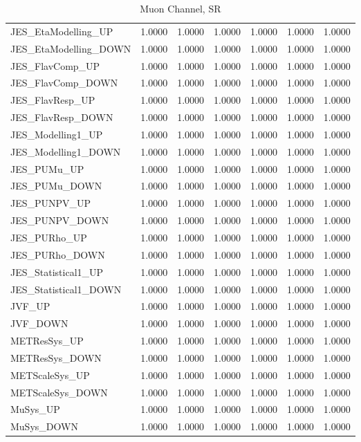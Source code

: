 \documentclass[11pt,oneside,a4paper]{article}
\begin{document}
\begin{table}
\begin{tabular}{lrrrrrr}
JES\_EtaModelling\_UP & 1.0000 & 1.0000 & 1.0000 & 1.0000 & 1.0000 & 1.0000 \\
JES\_EtaModelling\_DOWN & 1.0000 & 1.0000 & 1.0000 & 1.0000 & 1.0000 & 1.0000 \\
JES\_FlavComp\_UP & 1.0000 & 1.0000 & 1.0000 & 1.0000 & 1.0000 & 1.0000 \\
JES\_FlavComp\_DOWN & 1.0000 & 1.0000 & 1.0000 & 1.0000 & 1.0000 & 1.0000 \\
JES\_FlavResp\_UP & 1.0000 & 1.0000 & 1.0000 & 1.0000 & 1.0000 & 1.0000 \\
JES\_FlavResp\_DOWN & 1.0000 & 1.0000 & 1.0000 & 1.0000 & 1.0000 & 1.0000 \\
JES\_Modelling1\_UP & 1.0000 & 1.0000 & 1.0000 & 1.0000 & 1.0000 & 1.0000 \\
JES\_Modelling1\_DOWN & 1.0000 & 1.0000 & 1.0000 & 1.0000 & 1.0000 & 1.0000 \\
JES\_PUMu\_UP & 1.0000 & 1.0000 & 1.0000 & 1.0000 & 1.0000 & 1.0000 \\
JES\_PUMu\_DOWN & 1.0000 & 1.0000 & 1.0000 & 1.0000 & 1.0000 & 1.0000 \\
JES\_PUNPV\_UP & 1.0000 & 1.0000 & 1.0000 & 1.0000 & 1.0000 & 1.0000 \\
JES\_PUNPV\_DOWN & 1.0000 & 1.0000 & 1.0000 & 1.0000 & 1.0000 & 1.0000 \\
JES\_PURho\_UP & 1.0000 & 1.0000 & 1.0000 & 1.0000 & 1.0000 & 1.0000 \\
JES\_PURho\_DOWN & 1.0000 & 1.0000 & 1.0000 & 1.0000 & 1.0000 & 1.0000 \\
JES\_Statistical1\_UP & 1.0000 & 1.0000 & 1.0000 & 1.0000 & 1.0000 & 1.0000 \\
JES\_Statistical1\_DOWN & 1.0000 & 1.0000 & 1.0000 & 1.0000 & 1.0000 & 1.0000 \\
JVF\_UP & 1.0000 & 1.0000 & 1.0000 & 1.0000 & 1.0000 & 1.0000 \\
JVF\_DOWN & 1.0000 & 1.0000 & 1.0000 & 1.0000 & 1.0000 & 1.0000 \\
METResSys\_UP & 1.0000 & 1.0000 & 1.0000 & 1.0000 & 1.0000 & 1.0000 \\
METResSys\_DOWN & 1.0000 & 1.0000 & 1.0000 & 1.0000 & 1.0000 & 1.0000 \\
METScaleSys\_UP & 1.0000 & 1.0000 & 1.0000 & 1.0000 & 1.0000 & 1.0000 \\
METScaleSys\_DOWN & 1.0000 & 1.0000 & 1.0000 & 1.0000 & 1.0000 & 1.0000 \\
MuSys\_UP & 1.0000 & 1.0000 & 1.0000 & 1.0000 & 1.0000 & 1.0000 \\
MuSys\_DOWN & 1.0000 & 1.0000 & 1.0000 & 1.0000 & 1.0000 & 1.0000 \\
\end{tabular}
\caption{Muon Channel, SR}
\end{table}
\end{document}
